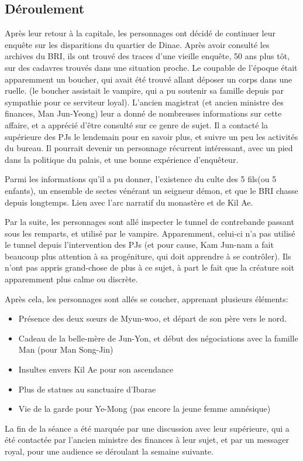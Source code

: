 \documentclass[10pt,a4paper]{book}
\begin{document}
\subsection{Déroulement}
Après leur retour à la capitale, les personnages ont décidé de continuer leur enquête sur les disparitions du quartier de Dinae. Après avoir consulté les archives du BRI, ils ont trouvé des traces d'une vieille enquête, 50 ans plus tôt, sur des cadavres trouvés dans une situation proche. Le coupable de l'époque était apparemment un boucher, qui avait été trouvé allant déposer un corps dans une ruelle. (le boucher assistait le vampire, qui a pu soutenir sa famille depuis par sympathie pour ce serviteur loyal). L'ancien magistrat (et ancien ministre des finances, Man Jun-Yeong) leur a donné de nombreuses informations sur cette affaire, et a apprécié d'être consulté sur ce genre de sujet. Il a contacté la supérieure des PJs le lendemain pour en savoir plus, et suivre un peu les activités du bureau. Il pourrait devenir un personnage récurrent intéressant, avec un pied dans la politique du palais, et une bonne expérience d'enquêteur.

Parmi les informations qu'il a pu donner, l'existence du culte des 5 fils(ou 5 enfants), un ensemble de sectes vénérant un seigneur démon, et que le BRI chasse depuis longtemps. Lien avec l'arc narratif du monastère et de Kil Ae.

Par la suite, les personnages sont allé inspecter le tunnel de contrebande passant sous les remparts, et utilisé par le vampire. Apparemment, celui-ci n'a pas utilisé le tunnel depuis l'intervention des PJs (et pour cause, Kam Jun-nam a fait beaucoup plus attention à sa progéniture, qui doit apprendre à se contrôler). Ils n'ont pas appris grand-chose de plus à ce sujet, à part le fait que la créature soit apparemment plus calme ou discrète.

Après cela, les personnages sont allés se coucher, apprenant plusieurs éléments:
\begin{itemize}
\item Présence des deux sœurs de Myun-woo, et départ de son père vers le nord.
\item Cadeau de la belle-mère de Jun-Yon, et début des négociations avec la famille Man (pour Man Song-Jin)
\item Insultes envers Kil Ae pour son ascendance
\item Plus de statues au sanctuaire d'Ibarae
\item Vie de la garde pour Ye-Mong (pas encore la jeune femme amnésique)
\end{itemize}
La fin de la séance a été marquée par une discussion avec leur supérieure, qui a été contactée par l'ancien ministre des finances à leur sujet, et par un messager royal, pour une audience se déroulant la semaine suivante.
\end{document}
